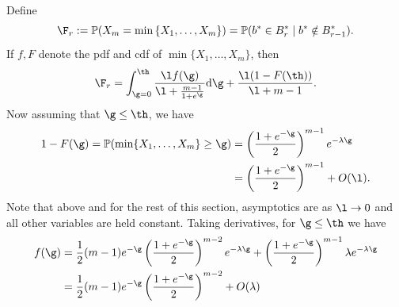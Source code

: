 \documentclass[12pt]{article}
\newcommand{\1}{\textbf{1}}
\newcommand{\bfrac}[2]{\left(\frac{#1}{#2}\right)}
\newcommand{\set}[1]{\left\{#1\right\}}
\def\dd{\text{d}}
\def\Pr{\mathbb{P}}
\begin{document}
Define
\[
\F_r:=\Pr(X_m=\min\set{X_1,\ldots,X_m}) = \Pr(b^*\in B_r^*\mid b^*\notin B_{r-1}^*).
\]
If $f, F$ denote the pdf and cdf of $\min\{X_1, \ldots, X_m\}$, then
\[
\F_r=\int_{\g=0}^\th\frac{\l f(\g)}{\l+\frac{m-1}{1+e^\g}}\dd\g +\frac{\l(1-F(\th))}{\l+m-1}.
\]
Now assuming that $\g \le \th$, we have
\begin{align*}
1-F(\g) = \Pr(\min\{X_1, \ldots, X_m\}\geq \g)&=\bfrac{1+e^{-\g}}{2}^{m-1}e^{-\lambda \g} \\
&=\bfrac{1+e^{-\g}}{2}^{m-1}+O(\l).
\end{align*}
Note that above and for the rest of this section, asymptotics are as $\l \rightarrow 0$ and all other variables are held constant. Taking derivatives, for  $\g\le \th$ we have 
\begin{align*}
  f(\g)&=\frac12(m-1)e^{-\g}\bfrac{1+e^{-\g}}{2}^{m-2}e^{-\lambda \g}+\bfrac{1+e^{-\g}}{2}^{m-1}\lambda e^{-\lambda \g}\\
  & = \frac12(m-1)e^{-\g}\bfrac{1+e^{-\g}}{2}^{m-2}+O(\lambda )
\end{align*}
\end{document}
